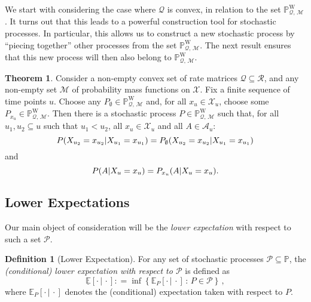 \documentclass[10pt,a4paper]{paper}
\theoremstyle{definition}
\newtheorem{theorem}{Theorem}[section]
\newtheorem{definition}{Definition}
\newcommand{\states}{\mathcal{X}}
\newcommand{\processes}{\mathbb{P}}
\newcommand{\wprocesses}{\processes^{\mathrm{W}}}
\newcommand{\rateset}{\mathcal{Q}}
\newcommand{\coloneqq}{:\!=}
\begin{document}
We start with considering the case where $\rateset$ is convex, in relation to the set $\wprocesses_{\rateset,\,\mathcal{M}}$. It turns out that this leads to a powerful construction tool for stochastic processes. In particular, this allows us to construct a new stochastic process by ``piecing together'' other processes from the set $\wprocesses_{\rateset,\,\mathcal{M}}$. The next result ensures that this new process will then also belong to $\wprocesses_{\rateset,\,\mathcal{M}}$.
\begin{theorem}\label{theo:aanelkaarplakken}
Consider a non-empty convex set of rate matrices $\rateset\subseteq\mathcal{R}$, and any non-empty set $\mathcal{M}$ of probability mass functions on $\states$.
Fix a finite sequence of time points $u$. Choose any $P_\emptyset\in\wprocesses_{\rateset,\,\mathcal{M}}$ and, for all $x_u\in\states_u$, choose some $P_{x_u}\in\wprocesses_{\rateset,\,\mathcal{M}}$. Then there is a stochastic process $P\in\wprocesses_{\rateset,\,\mathcal{M}}$ such that, for all $u_1,u_2\subseteq u$ such that $u_1<u_2$, all $x_u\in\states_u$ and all $A\in\mathcal{A}_u$:
\begin{equation}\label{eq:theo:aanelkaarplakken:equalsfirst}
P(X_{u_2}=x_{u_2}\vert X_{u_1}=x_{u_1})=P_{\emptyset}(X_{u_2}=x_{u_2}\vert X_{u_1}=x_{u_1})
\vspace{-7pt}
\end{equation}
and
\begin{equation}\label{eq:theo:aanelkaarplakken:equalssecond}
P(A\vert X_u=x_u)=P_{x_u}(A\vert X_u=x_u).
\vspace{7pt}
\end{equation}
\end{theorem}


\subsection{Lower Expectations} Our main object of consideration will be the \emph{lower expectation} with respect to such a set $\mathcal{P}$.

\begin{definition}[Lower Expectation]\label{def:lower_exp}
For any set of stochastic processes $\mathcal{P}\subseteq\processes$, the \emph{(conditional) lower expectation with respect to $\mathcal{P}$} is defined as
\begin{equation*}
\underline{\mathbb{E}}[\cdot\,\vert\,\cdot] \coloneqq \inf\left\{\mathbb{E}_P[\cdot\,\vert\,\cdot]\,:\,P\in\mathcal{P}\right\}\,,
\end{equation*}
where $\mathbb{E}_P[\cdot\,\vert\,\cdot]$ denotes the (conditional) expectation taken with respect to $P$.
\vspace{0pt}
\end{definition}
\end{document}
